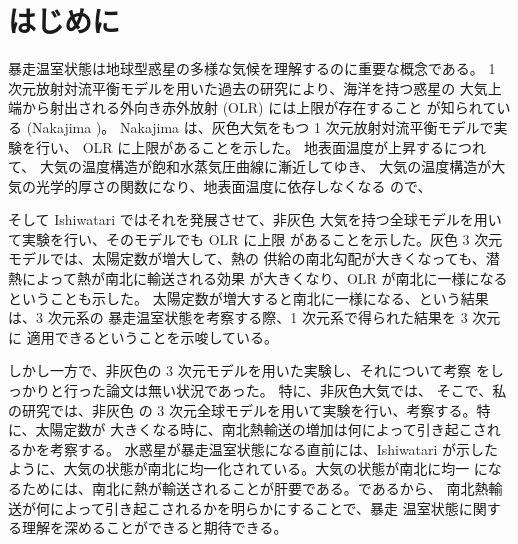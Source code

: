 \documentclass[body]{subfiles}
\begin{document}
\chapter{はじめに}
暴走温室状態は地球型惑星の多様な気候を理解するのに重要な概念である。
1 次元放射対流平衡モデルを用いた過去の研究により、海洋を持つ惑星の
大気上端から射出される外向き赤外放射 (OLR) には上限が存在すること
が知られている (Nakajima )。
Nakajima \etal は、灰色大気をもつ 1 次元放射対流平衡モデルで実験を行い、
OLR に上限があることを示した。
地表面温度が上昇するにつれて、
大気の温度構造が飽和水蒸気圧曲線に漸近してゆき、
大気の温度構造が大気の光学的厚さの関数になり、地表面温度に依存しなくなる
ので、

そして Ishiwatari  ではそれを発展させて、非灰色
大気を持つ全球モデルを用いて実験を行い、そのモデルでも OLR に上限
があることを示した。灰色 3 次元モデルでは、太陽定数が増大して、熱の
供給の南北勾配が大きくなっても、潜熱によって熱が南北に輸送される効果
が大きくなり、OLR が南北に一様になるということも示した。
太陽定数が増大すると南北に一様になる、という結果は、3 次元系の
暴走温室状態を考察する際、1 次元系で得られた結果を 3 次元に
適用できるということを示唆している。

しかし一方で、非灰色の 3 次元モデルを用いた実験し、それについて考察
をしっかりと行った論文は無い状況であった。
特に、非灰色大気では、
そこで、私の研究では、非灰色
の 3 次元全球モデルを用いて実験を行い、考察する。特に、太陽定数が
大きくなる時に、南北熱輸送の増加は何によって引き起こされるかを考察する。
水惑星が暴走温室状態になる直前には、Ishiwatari  が示した
ように、大気の状態が南北に均一化されている。大気の状態が南北に均一
になるためには、南北に熱が輸送されることが肝要である。であるから、
南北熱輸送が何によって引き起こされるかを明らかにすることで、暴走
温室状態に関する理解を深めることができると期待できる。
\end{document}
